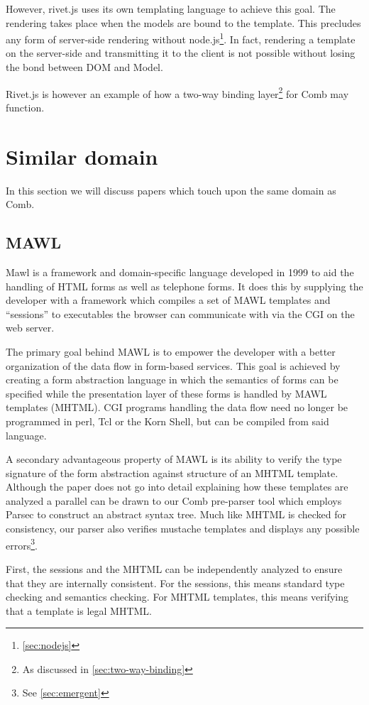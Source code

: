 \documentclass[thesis.tex]{subfiles}
\begin{document}
However, rivet.js uses its own templating language to achieve this goal.
The rendering takes place when the models are bound to the template.
This precludes any form of server-side rendering without node.js\footnote{
\ref{sec:nodejs}}. In fact, rendering a template on the server-side and
transmitting it to the client is not possible without losing the bond between
DOM and Model.

Rivet.js is however an example of how a two-way binding layer\footnote{
As discussed in \ref{sec:two-way-binding}} for Comb may function.



\section{Similar domain}
In this section we will discuss papers which touch upon the same domain as Comb.

\subsection{MAWL}
Mawl\cite{MAWL} is a framework and domain-specific language developed in 1999
to aid the handling of HTML forms as well as telephone forms.
It does this by supplying the developer with a framework which compiles
a set of MAWL templates and ``sessions'' to executables
the browser can communicate with via the CGI on the web server.

The primary goal behind MAWL is to empower the developer with a better
organization of the data flow in form-based services.
This goal is achieved by creating a form abstraction language in which the
semantics of forms can be specified while the presentation layer of these forms
is handled by MAWL templates (MHTML).
CGI programs handling the data flow need no longer be programmed in
perl, Tcl or the Korn Shell, but can be compiled from said language.

A secondary advantageous property of MAWL is its ability to verify the
type signature of the form abstraction against structure of an MHTML template.
Although the paper does not go into detail explaining how these templates are
analyzed a parallel can be drawn to our Comb pre-parser tool which employs
Parsec to construct an abstract syntax tree. Much like MHTML is checked for
consistency, our parser also verifies mustache templates and displays any
possible errors\footnote{See \ref{sec:emergent}}.
\begin{citequote}{\cite{MAWL}}
First, the sessions and the MHTML can be independently analyzed to ensure that
they are internally consistent.
For the sessions, this means standard type checking and semantics checking.
For MHTML templates, this means verifying that a template is legal MHTML.
\end{citequote}
\end{document}

